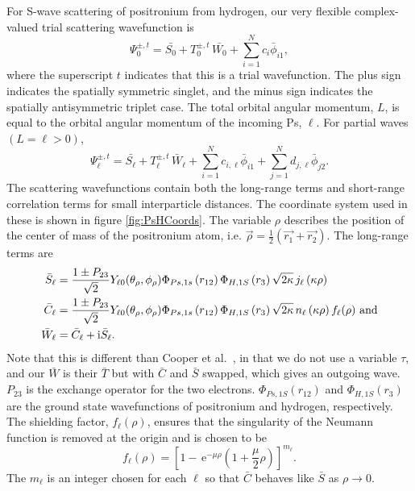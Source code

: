 \documentclass[preprint,showpacs,preprintnumbers,amsmath,amssymb]{revtex4}
\newcommand{\ee} {\,\text{e}}
\newcommand{\ii}{{\rm{i}}}
\begin{document}
For S-wave scattering of positronium from hydrogen, our very flexible complex-valued trial scattering wavefunction is
\begin{equation}
\Psi_0^{\pm,t} = \bar{S_0} + T_0^{\pm,t} \, \bar{W_0} + \sum_{i=1}^N c_i \bar{\phi}_{i1},
\label{eq:TrialWave}
\end{equation}
where the superscript $t$ indicates that this is a trial wavefunction. The plus sign indicates the spatially symmetric singlet, and the minus sign indicates the spatially antisymmetric triplet case. The total orbital angular momentum, $L$, is equal to the orbital angular momentum of the incoming Ps, $\ell$. For partial waves $(L = \ell > 0)$,
\begin{equation}
\Psi_\ell^{\pm,t} = \bar{S_\ell} + T^{\pm,t}_\ell \, \bar{W}_\ell + \sum_{i=1}^N c_{i,\ell} \bar{\phi}_{i1} + \sum_{j=1}^N d_{j,\ell} \bar{\phi}_{j2}.
\label{eq:TrialWaveHigher}
\end{equation}
The scattering wavefunctions contain both the long-range terms and short-range correlation terms for small interparticle distances. The coordinate system used in these is shown in figure \ref{fig:PsHCoords}. The variable $\rho$ describes the position of the center of mass of the positronium atom, i.e. $\vec{\rho} = \frac{1}{2}\left(\vec{r_1} + \vec{r_2}\right)$. The long-range terms are
\begin{subequations}
\label{eq:SCPhiDef}
\begin{align}
\bar{S}_\ell &= \frac{1\pm P_{23}}{\sqrt{2}}Y_{\ell 0}(\theta_\rho,\phi_\rho)\Phi_{Ps,1s}\left(r_{12}\right) \Phi_{H,1S}\left(r_3\right) \sqrt{2\kappa} \,j_\ell\left(\kappa\rho\right) \label{eq:SBar} \\
\bar{C}_\ell &= \frac{1\pm P_{23}}{\sqrt{2}}Y_{\ell 0}(\theta_\rho,\phi_\rho)\Phi_{Ps,1s}\left(r_{12}\right) \Phi_{H,1S}\left(r_3\right) \sqrt{2\kappa} \,n_\ell\left(\kappa\rho\right) f_\ell(\rho) \text{ and}\label{eq:CBar} \\
\bar{W}_\ell &= \bar{C}_\ell + \ii \bar{S}_\ell.
\end{align}
\end{subequations}
Note that this is different than Cooper et al.\ \cite{Cooper2010}, in that we do not use a variable $\tau$, and our $\bar{W}$ is their $\bar{T}$ but with $\bar{C}$ and $\bar{S}$ swapped, which gives an outgoing wave. $P_{23}$ is the exchange operator for the two electrons. $\Phi_{Ps,1S}\left(r_{12}\right)$ and $\Phi_{H,1S}\left(r_3\right)$ are the ground state wavefunctions of positronium and hydrogen, respectively. The shielding factor, $f_\ell(\rho)$, ensures that the singularity of the Neumann function is removed at the origin and is chosen to be
\begin{equation}
f_\ell(\rho) = \left[1 - \ee^{-\mu \rho} \left(1+\frac{\mu}{2}\rho\right)\right]^{m_\ell}.
\label{eq:PartialWaveShielding}
\end{equation}
The $m_\ell$ is an integer chosen for each $\ell$ so that $\bar{C}$ behaves like $\bar{S}$ as $\rho \rightarrow 0$.
\end{document}

